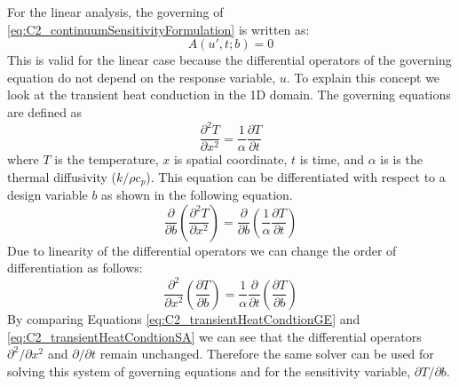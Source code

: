 For the linear analysis, the governing  of \eqref{eq:C2_continuumSensitivityFormulation} is written as:
%
\begin{equation}\label{eq:C2_linearSAgoverningEquation}
    A(u', t; b) = 0 
\end{equation}
%
This is valid for the linear case because the differential operators of the governing equation do not depend on the response variable, $u$. To explain this concept we look at the transient heat conduction in the 1D domain. The governing equations are defined as
%
\begin{equation}\label{eq:C2_transientHeatCondtionGE}
    \frac{\partial^2 T}{\partial x^2} = \frac{1}{\alpha} \frac{\partial T}{\partial t}
\end{equation}
%
where $T$ is the temperature, $x$ is spatial coordinate, $t$ is time, and $\alpha$ is is the thermal diffusivity ($k/\rho c_p$). This equation can be differentiated with respect to a design variable $b$ as shown in the following equation.
%
\begin{equation*}
    \frac{\partial}{\partial b}
    \left( \frac{\partial^2 T}{\partial x^2}\right) = 
    \frac{\partial}{\partial b}
    \left( \frac{1}{\alpha} \frac{\partial T}{\partial t}\right)
\end{equation*}
%
Due to linearity of the differential operators we can change the order of differentiation as follows:
%
\begin{equation}\label{eq:C2_transientHeatCondtionSA}
    \frac{\partial^2}{\partial x^2}
    \left( \frac{\partial T}{\partial b} \right) = 
    \frac{1}{\alpha} \frac{\partial}{\partial t}
    \left( \frac{\partial T}{\partial b}\right)
\end{equation}
%
By comparing Equations \eqref{eq:C2_transientHeatCondtionGE} and \eqref{eq:C2_transientHeatCondtionSA} we can see that the differential operators $\partial^2 /\partial x^2$ and $\partial /\partial t$ remain unchanged. Therefore the same solver can be used for solving this system of governing equations and for the sensitivity variable, $\partial T/\partial b$.

